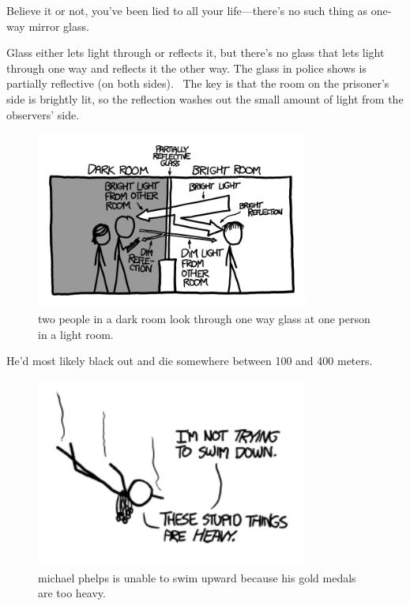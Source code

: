 
\hfill{}

{Believe it or not, you’ve been lied to all your life—there’s no such thing as one-way mirror glass.}

{Glass either lets light through or reflects it, but there’s no glass that lets light through one way and reflects it the other way. The glass in police shows is partially reflective (on both sides).  The key is that the room on the prisoner’s side is brightly lit, so the reflection washes out the small amount of light from the observers’ side.}

\begin{figure}[!htbp]
\centering
\includegraphics[scale=0.5, max width=0.8\textwidth]{imgs/a/14/short_answers_oneway.png}
\caption{two people in a dark room look through one way glass at one person in a light room.}
\end{figure}


\hfill{}

{He’d most likely black out and die somewhere between 100 and 400 meters.}

\begin{figure}[!htbp]
\centering
\includegraphics[scale=0.5, max width=0.8\textwidth]{imgs/a/14/short_answers_phelps.png}
\caption{michael phelps is unable to swim upward because his gold medals are too heavy.}
\end{figure}

